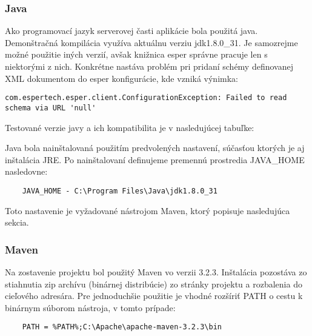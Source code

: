\subsubsection{Java}	%
	Ako programovací jazyk serverovej časti aplikácie bola použitá java. Demonštračná kompilácia využíva aktuálnu verziu jdk1.8.0\_31. Je samozrejme možné použitie iných verzií, avšak knižnica esper správne pracuje len s niektorými z nich. Konkrétne nastáva problém pri pridaní schémy definovanej XML dokumentom do esper konfigurácie, kde vzniká výnimka:
	\begin{lstlisting}[label=lst:exjava,caption=Výnimka pri definovaní XML schémy v niektorých verziách javy]
	com.espertech.esper.client.ConfigurationException: Failed to read schema via URL 'null'
	\end{lstlisting}
	
	Testované verzie javy a ich kompatibilita je v nasledujúcej tabuľke:
	
	Java bola nainštalovaná použitím predvolených nastavení, súčasťou ktorých je aj inštalácia JRE. Po nainštalovaní definujeme premennú prostredia JAVA\_HOME nasledovne:
	\begin{lstlisting}
	JAVA_HOME - C:\Program Files\Java\jdk1.8.0_31
	\end{lstlisting}
	Toto nastavenie je vyžadované nástrojom Maven, ktorý popisuje nasledujúca sekcia.
	
\subsubsection{Maven}	%
	Na zostavenie projektu bol použitý Maven vo verzii 3.2.3. Inštalácia pozostáva zo stiahnutia zip archívu (binárnej distribúcie) zo stránky projektu a rozbalenia do cieľového adresára. Pre jednoduchšie použitie je vhodné rozšíriť PATH o cestu k binárnym súborom nástroja, v tomto prípade:
	\begin{lstlisting}
	PATH = %PATH%;C:\Apache\apache-maven-3.2.3\bin
	\end{lstlisting}

